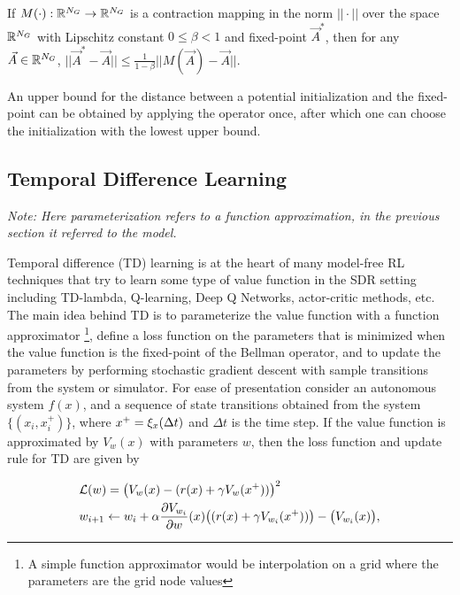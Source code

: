 \begin{proposition} If $M(\cdot): \mathbb{R}^{N_G} \rightarrow \mathbb{R}^{N_G}$ is a contraction mapping in the norm $|| \cdot ||$ over the space $\mathbb{R}^{N_G}$ with Lipschitz constant $0\leq \beta < 1$ and fixed-point $\vec{A}^*$, then for any $\vec{A} \in \mathbb{R}^{N_G}$,  $||\vec{A}^* - \vec{A}|| \leq \frac{1}{1-\beta}||M(\vec{A}) - \vec{A}||$. 
\end{proposition}

An upper bound for the distance between a potential initialization and the fixed-point can be obtained by applying the operator once, after which one can choose the initialization with the lowest upper bound.

\subsection{Temporal Difference Learning}

\emph{Note: Here parameterization refers to a function approximation, in the previous section it referred to the model.}

Temporal difference (TD) learning is at the heart of many model-free RL techniques that try to learn some type of value function in the SDR setting including TD-lambda, Q-learning, Deep Q Networks, actor-critic methods, etc. The main idea behind TD is to parameterize the value function with a function approximator \footnote{A simple function approximator would be interpolation on a grid where the parameters are the grid node values}, define a loss function on the parameters that is minimized when the value function is the fixed-point of the Bellman operator, and to update the parameters by performing stochastic gradient descent with sample transitions from the system or simulator. For ease of presentation consider an autonomous system $f(x)$, and a sequence of state transitions obtained from the system $\{(x_i,x_i^+)\}$, where $x^+=\xi_x(\Delta t)$ and $\Delta t$ is the time step. If the value function is approximated by $V_w(x)$ with parameters $w$, then the loss function and update rule for TD are given by

\begin{equation}
\begin{split}
&\mathcal{L}(w)=\big(V_{w}(x) - (r(x)+\gamma V_{w}(x^+))\big)^2\\
&w_{i+1} \leftarrow w_i + \alpha\frac{\partial V_{w_i}}{\partial w}(x)\big((r(x)+\gamma V_{w_i}(x^+))\big)- \big(V_{w_i}(x)\big),
\end{split}
\end{equation}

